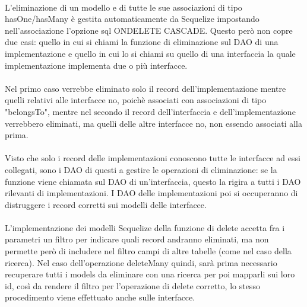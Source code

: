 \documentclass[a4paper, 12pt]{report}
\begin{document}
      \paragraph*{}
      L'eliminazione di un modello e di tutte le sue associazioni di tipo hasOne/hasMany è gestita automaticamente da Sequelize impostando nell'associazione l'opzione sql ONDELETE CASCADE.
      Questo però non copre due casi: quello in cui si chiami la funzione di eliminazione sul DAO di una implementazione e quello in cui lo si chiami su quello di una interfaccia la quale implementazione implementa due o più interfacce.
      \paragraph*{}
      Nel primo caso verrebbe eliminato solo il record dell'implementazione mentre quelli relativi alle interfacce no, poichè associati con associazioni di tipo "belongsTo", mentre nel secondo il record dell'interfaccia e dell'implementazione verrebbero eliminati, ma quelli delle altre interfacce no, non essendo associati alla prima.
      \paragraph*{}
      Visto che solo i record delle implementazioni conoscono tutte le interfacce ad essi collegati, sono i DAO di questi a gestire le operazioni di eliminazione: se la funzione viene chiamata sul DAO di un'interfaccia, questo la rigira a tutti i DAO rilevanti di implementazioni.
      I DAO delle implementazioni poi si occuperanno di distruggere i record corretti sui modelli delle interfacce.
      \paragraph*{}
      L'implementazione dei modelli Sequelize della funzione di delete accetta fra i parametri un filtro per indicare quali record andranno eliminati, ma non permette però di includere nel filtro campi di altre tabelle (come nel caso della ricerca).
      Nel caso dell'operazione deleteMany quindi, sarà prima necessario recuperare tutti i models da eliminare con una ricerca per poi mapparli sui loro id, così da rendere il filtro per l'operazione di delete corretto, lo stesso procedimento viene effettuato anche sulle interfacce.

    \newpage
\end{document}

